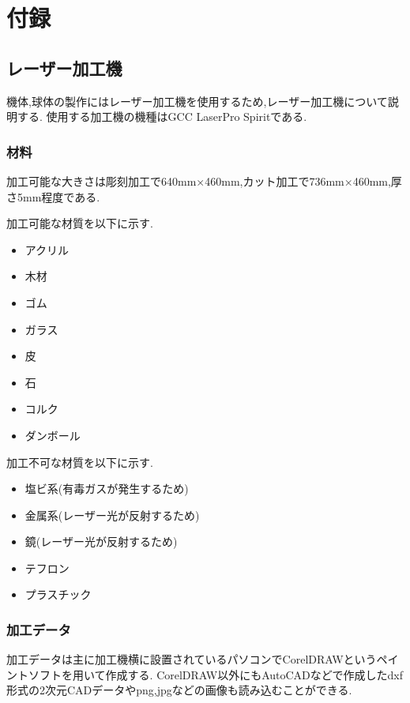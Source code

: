 \documentclass[12pt,oneside]{sotsuken_paper}
\begin{document}
\chapter*{付録}
\appendix
\renewcommand{\thesection}{A}
\renewcommand{\thesubsection}{A.\ \arabic{section}}

\section{レーザー加工機}
機体,球体の製作にはレーザー加工機を使用するため,レーザー加工機について説明する.
使用する加工機の機種はGCC LaserPro Spiritである.

\subsection{材料}
加工可能な大きさは彫刻加工で640mm×460mm,カット加工で736mm×460mm,厚さ5mm程度である.

加工可能な材質を以下に示す.

\begin{itemize}
	\item アクリル
	\item 木材
	\item ゴム
	\item ガラス
	\item 皮
	\item 石
	\item コルク
	\item ダンボール
\end{itemize}

加工不可な材質を以下に示す.

\begin{itemize}
	\item 塩ビ系(有毒ガスが発生するため)
	\item 金属系(レーザー光が反射するため)
	\item 鏡(レーザー光が反射するため)
	\item テフロン
	\item プラスチック
\end{itemize}

\subsection{加工データ}
加工データは主に加工機横に設置されているパソコンでCorelDRAWというペイントソフトを用いて作成する.
CorelDRAW以外にもAutoCADなどで作成したdxf形式の2次元CADデータやpng,jpgなどの画像も読み込むことができる.
\end{document}

